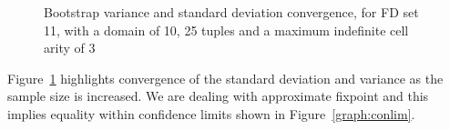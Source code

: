 \begin{figure}
\begin{minipage}{7cm}
\centerline{}
\end{minipage}
\hfill
\begin{minipage}{7cm}
\centerline{}
\end{minipage}
\caption{\label{graph:7.4} {Bootstrap variance and standard deviation
convergence, for FD set 11, with a domain of 10, 25 tuples and a maximum indefinite cell arity of 3}}
\end{figure}


Figure~\ref{graph:7.4} highlights convergence of the standard
deviation and variance as the sample size is increased. We are dealing
with approximate fixpoint and this implies equality within confidence
limits shown in Figure~\ref{graph:conlim}. 

